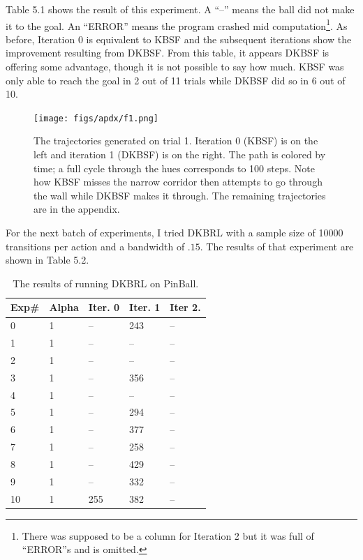 Table 5.1 shows the result of this experiment.
A ``--'' means the ball did not make it to the goal.
An ``ERROR'' means the program crashed mid computation\footnote{There was
supposed to be a column for Iteration 2 but it was full of ``ERROR''s and
is omitted.}.
As before, Iteration 0 is equivalent to KBSF and the subsequent iterations
show the improvement resulting from DKBSF.
From this table, it appears DKBSF is offering some advantage, though it is
not possible to say how much.
KBSF was only able to reach the goal in 2 out of 11 trials while DKBSF did so
in 6 out of 10.

\begin{figure}[!!!ht]
  \centering
    \texttt{[image: figs/apdx/f1.png]}
  \caption[DKBSF on PinBall sample trajectory]{The trajectories generated
on trial 1. Iteration 0 (KBSF) is on the left and iteration 1 (DKBSF) is on
the right. The path is colored by time; a full cycle through the hues
corresponds to 100 steps.
Note how KBSF misses the narrow corridor then attempts to go through the wall
while DKBSF makes it through. The remaining trajectories are in the appendix. }
\end{figure}

For the next batch of experiments, I tried DKBRL with a sample size of
10000 transitions per action and a bandwidth of $.15$.
The results of that experiment are shown in Table 5.2.

\begin{table}[H]
\begin{center}
    \begin{tabular}{| l | l | l | l | l |}
    \hline
Exp\# & Alpha & Iter. 0 & Iter. 1 & Iter 2. \\ \hline
0 & 1 & -- & 243 & --\\
1 & 1 & -- & -- & --\\
2 & 1 & -- & -- & --\\
3 & 1 & -- & 356 & --\\
4 & 1 & -- & -- & --\\
5 & 1 & -- & 294 & --\\
6 & 1 & -- & 377 & --\\
7 & 1 & -- & 258 & --\\
8 & 1 & -- & 429 & --\\
9 & 1 & -- & 332 & --\\
10& 1 & 255 & 382 & --\\
    \hline
    \end{tabular}
\end{center}
    \caption[DKBRL PinBall results]{The results of running DKBRL on PinBall.}
\end{table}

